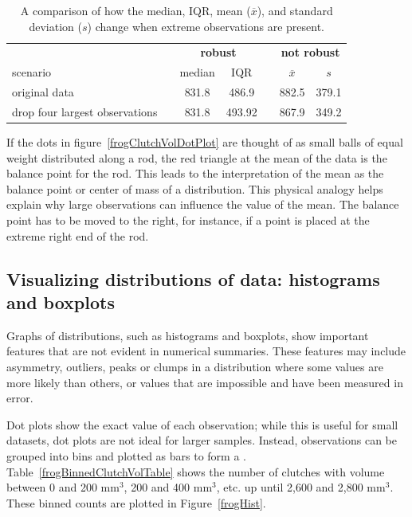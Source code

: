 \begin{table}[ht]
	\centering
	\begin{tabular}{l c cc c cc}
		\hline
		& \hspace{0mm} & \multicolumn{2}{c}{\bf robust} & \hspace{2mm} & \multicolumn{2}{c}{\bf not robust} \\
		scenario && median & IQR && $\overline{x}$ & $s$ \\ 
		\hline
		original \var{frog} data 	&& 831.8 & 486.9 && 882.5 & 379.1 \\
		drop four largest observations && 831.8 & 493.92 && 867.9 & 349.2 \\
		\hline
	\end{tabular}
	\caption{A comparison of how the median, IQR, mean ($\overline{x}$), and standard deviation ($s$) change when extreme observations are present.}
	\label{frogRobustOrNotTable}
\end{table}

If the dots in figure~\ref{frogClutchVolDotPlot} are thought of as small balls of equal weight distributed along a rod, the red triangle at the mean of the data is the balance point for the rod. This leads to the interpretation of the mean as the balance point or center of mass of a distribution. This physical analogy helps explain why large observations can influence the value of the mean.  The balance point has to be moved to the right, for instance, if a point is placed at the extreme right end of the rod.


\subsection{Visualizing distributions of data: histograms and boxplots}
\label{histogramsBoxplots}

Graphs of distributions, such as histograms and boxplots, show important features that are not evident in numerical summaries.  These features may include asymmetry, outliers, peaks or clumps in a distribution where some values are more likely than others, or values that are impossible and have been measured in error.

Dot plots show the exact value of each observation; while this is useful for small datasets, dot plots are not ideal for larger samples. Instead, observations can be grouped into bins and plotted as bars to form a . Table~\ref{frogBinnedClutchVolTable} shows the number of clutches with volume between 0 and 200 $\textrm{mm}^{3}$, 200 and 400 $\textrm{mm}^{3}$, etc. up until 2,600 and 2,800 $\textrm{mm}^{3}$. These binned counts are plotted in Figure~\ref{frogHist}.

